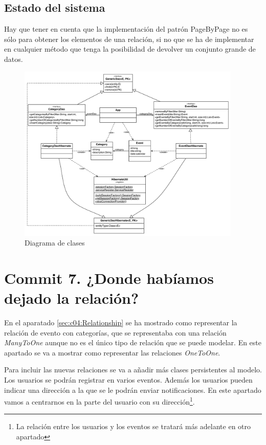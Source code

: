 \documentclass{article}
\begin{document}
\subsection{Estado del sistema}
	Hay que tener en cuenta que la implementación del patrón PageByPage no es sólo para obtener los elementos de una relación, si no que se ha de implementar en cualquier método que tenga la posibilidad de devolver un conjunto grande de datos.
	
\begin{figure}[h]
  \centering
    \includegraphics[width=0.95\textwidth]{commit06/img/UmlClass.pdf}
  \caption{Diagrama de clases}
  \label{fig:c05:UmlClass}
\end{figure}	

\section{Commit 7. ¿Donde habíamos dejado la relación?}

	En el aparatado \ref{sec:c04:Relationship} se ha mostrado como representar la relación de evento con categorías, que se representaba con una relación \emph{ManyToOne} aunque no es el único tipo de relación que se puede modelar. En este apartado se va a mostrar como representar las relaciones \emph{OneToOne}.
	
	Para incluir las nuevas relaciones se va a añadir más clases persistentes al modelo. Los usuarios se podrán registrar en varios eventos. Además los usuarios pueden indicar una dirección a la que se le podrán enviar notificaciones. En este apartado vamos a centrarnos en la parte del usuario con su dirección\footnote{La relación entre los usuarios y los eventos se tratará más adelante en otro apartado}.
	
\end{document}

